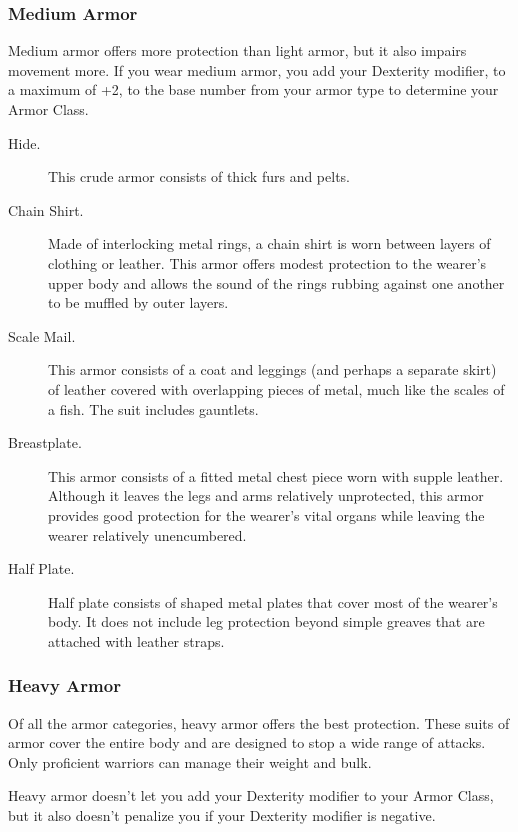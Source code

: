 \subsubsection{Medium Armor}\label{equipment-armor-medium-armor}

Medium armor offers more protection than light armor, but it also
impairs movement more. If you wear medium armor, you add your Dexterity
modifier, to a maximum of +2, to the base number from your armor type to
determine your Armor Class.

\begin{description}
\item[Hide.]
This crude armor consists of thick furs and pelts.
\item[Chain Shirt.]
Made of interlocking metal rings, a chain shirt is worn between layers
of clothing or leather. This armor offers modest protection to the
wearer's upper body and allows the sound of the rings rubbing against
one another to be muffled by outer layers.
\item[Scale Mail.]
This armor consists of a coat and leggings (and perhaps a separate
skirt) of leather covered with overlapping pieces of metal, much like
the scales of a fish. The suit includes gauntlets.
\item[Breastplate.]
This armor consists of a fitted metal chest piece worn with supple
leather. Although it leaves the legs and arms relatively unprotected,
this armor provides good protection for the wearer's vital organs while
leaving the wearer relatively unencumbered.
\item[Half Plate.]
Half plate consists of shaped metal plates that cover most of the
wearer's body. It does not include leg protection beyond simple greaves
that are attached with leather straps.
\end{description}

\subsubsection{Heavy Armor}\label{equipment-armor-heavy-armor}

Of all the armor categories, heavy armor offers the best protection.
These suits of armor cover the entire body and are designed to stop a
wide range of attacks. Only proficient warriors can manage their weight
and bulk.

Heavy armor doesn't let you add your Dexterity modifier to your Armor
Class, but it also doesn't penalize you if your Dexterity modifier is
negative.

